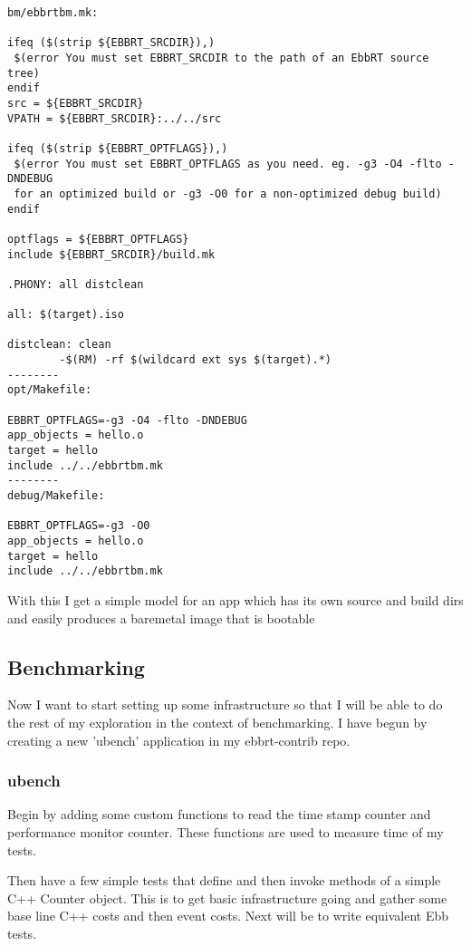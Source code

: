 \documentclass[11pt]{report}
\begin{document}
\begin{verbatim}
bm/ebbrtbm.mk:

ifeq ($(strip ${EBBRT_SRCDIR}),)
 $(error You must set EBBRT_SRCDIR to the path of an EbbRT source tree)
endif
src = ${EBBRT_SRCDIR}
VPATH = ${EBBRT_SRCDIR}:../../src

ifeq ($(strip ${EBBRT_OPTFLAGS}),)
 $(error You must set EBBRT_OPTFLAGS as you need. eg. -g3 -O4 -flto -DNDEBUG 
 for an optimized build or -g3 -O0 for a non-optimized debug build)
endif

optflags = ${EBBRT_OPTFLAGS}
include ${EBBRT_SRCDIR}/build.mk

.PHONY: all distclean

all: $(target).iso

distclean: clean
        -$(RM) -rf $(wildcard ext sys $(target).*)
--------
opt/Makefile:

EBBRT_OPTFLAGS=-g3 -O4 -flto -DNDEBUG
app_objects = hello.o
target = hello
include ../../ebbrtbm.mk
--------
debug/Makefile:

EBBRT_OPTFLAGS=-g3 -O0
app_objects = hello.o
target = hello
include ../../ebbrtbm.mk
\end{verbatim}

With this I get a simple model for an app which has its own source and build dirs
and easily produces a baremetal image that is bootable

\subsection{Benchmarking}

Now I want to start setting up some infrastructure so that I will be able 
to do the rest of my exploration in the context of benchmarking.  I have begun 
by creating a new 'ubench' application in my ebbrt-contrib repo.  

\subsubsection{ubench}

Begin by adding some custom functions to read the time stamp counter and performance monitor counter.  These functions are used to measure time of my tests.

Then have a few simple tests that define and then invoke methods of a simple C++ Counter object.  This is to get basic infrastructure going and gather some base line C++ costs and then event costs.  Next will be to write equivalent Ebb tests.

 
\end{document}
